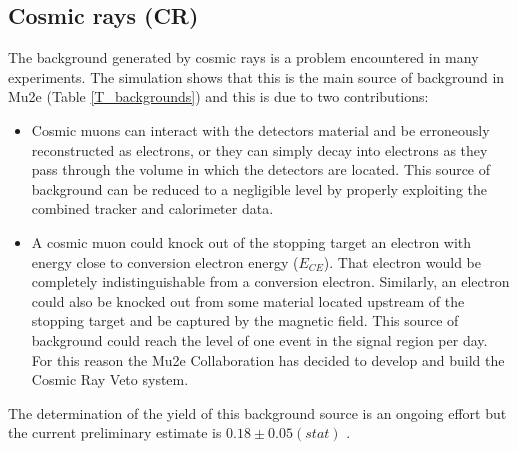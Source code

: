 \documentclass[12pt,a4paper,openright, oneside, titlepage]{book} %
\begin{document}
\subsection{Cosmic rays (CR)}
The background generated by cosmic rays is a problem encountered in many experiments.
The simulation shows that this is the main source of background in Mu2e (Table \ref{T_backgrounds}) and this is due to two contributions:

\begin{itemize}
\item Cosmic muons can interact with the detectors material and be erroneously reconstructed as electrons, or they can simply decay into electrons as they pass through the volume in which the detectors are located. 
This source of background can be reduced to a negligible level by properly exploiting the combined tracker and calorimeter data.
\item A cosmic muon could knock out of the stopping target an electron with energy close to conversion electron energy ($E_{CE}$). 
That electron would be completely indistinguishable from a conversion electron. 
Similarly, an electron could also be knocked out from some material located upstream of the stopping target and be captured by the magnetic field. 
This source of background could reach the level of one event in the signal region per day.
For this reason the Mu2e Collaboration has decided to develop and build the Cosmic Ray Veto system.
\end{itemize}
The determination of the yield of this background source is an ongoing effort but the current preliminary estimate is $0.18\pm0.05(stat)$ \cite{CRV_now}.
\end{document}
